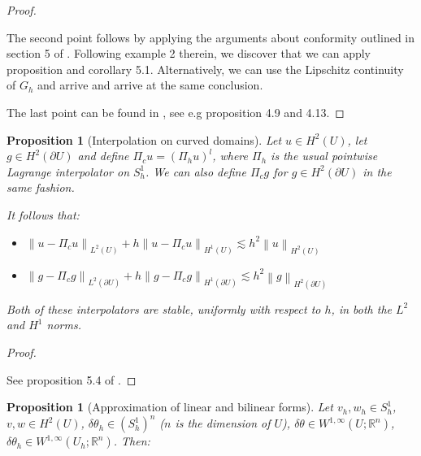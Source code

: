 \documentclass[english,a4paper,10pt,oneside]{scrbook}	%
\theoremstyle{break}
\newtheorem{prop}[equation]{Proposition}
\newenvironment{mproof}[1][\proofname]{%
  \begin{proof}[#1]$ $\par\nobreak\ignorespaces
}{%
  \end{proof}
}
\renewcommand*{\proofname}{Proof}
\theoremstyle{remark}
\newcommand{\mR}{\mathbb{R}}
\newcommand{\norm}[1]{\left\lVert#1\right\rVert}
\newcommand{\te}{\theta}
\begin{document}
\begin{appendices}
\begin{mproof}
The second point follows by applying the arguments about conformity outlined in section 5 of \cite{bernardi}. Following example 2 therein, we discover that we can apply proposition and corollary 5.1. Alternatively, we can use the Lipschitz continuity of $G_h$ and arrive and arrive at the same conclusion.

The last point can be found in \cite{elliott}, see e.g proposition 4.9 and 4.13.
%
%
%
%
\end{mproof}

\begin{prop}[Interpolation on curved domains]
\label{prop:interp_curv}
Let $u \in H^2(U)$, let $g \in H^2(\partial U)$ and define $\Pi_c u = (\Pi_h u )^l$, where $\Pi_h$ is the usual pointwise Lagrange interpolator on $S^1_h$.
We can also define $\Pi_c g $ for $g \in H^2(\partial U)$ in the same fashion. 

It follows that:

\begin{itemize}
	\item $\norm{u-\Pi_c u}_{L^2(U)} + h \norm{u-\Pi_c u}_{H^1(U)}\lesssim h^2\norm{u}_{H^2(U)}$
	\item $\norm{g-\Pi_c g}_{L^2(\partial U)} + h \norm{g-\Pi_c g}_{H^1(\partial U)}\lesssim h^2\norm{g}_{H^2(\partial U)}$
\end{itemize}
Both of these interpolators are stable, uniformly with respect to $h$, in both the $L^2$ and $H^1$ norms.
\end{prop}

\begin{mproof}
See proposition 5.4 of \cite{elliott}.
\end{mproof}

\begin{prop}[Approximation of linear and bilinear forms]
\label{prop:lin_appr}
Let $v_h, w_h \in S^1_h$, $v,w \in H^2(U)$, $\delta \te_h \in (S^1_h)^n$ ($n$ is the dimension of $U$), $\delta \te \in W^{1,\infty}(U;\mR^n)$, $\delta \te_h \in W^{1,\infty}(U_h;\mR^n)$. Then:


\end{prop}
\end{appendices}
\end{document}
